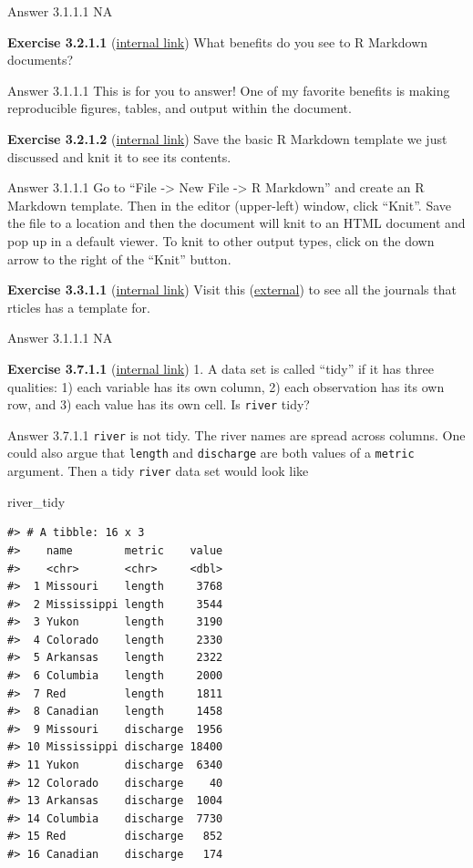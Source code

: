 \documentclass[
]{book}
\newenvironment{Shaded}{\begin{snugshade}}{\end{snugshade}}
\newcommand{\NormalTok}[1]{#1}
\begin{document}
Answer 3.1.1.1
NA

\textbf{Exercise 3.2.1.1} (\protect\hyperlink{ex-set12}{internal link})
What benefits do you see to R Markdown documents?

Answer 3.1.1.1
This is for you to answer! One of my favorite benefits is making reproducible figures, tables, and output within the document.

\textbf{Exercise 3.2.1.2} (\protect\hyperlink{ex-set12}{internal link})
Save the basic R Markdown template we just discussed and knit it to see its contents.

Answer 3.1.1.1
Go to ``File -\textgreater{} New File -\textgreater{} R Markdown'' and create an R Markdown template. Then in the editor (upper-left) window, click ``Knit''. Save the file to a location and then the document will knit to an HTML document and pop up in a default viewer. To knit to other output types, click on the down arrow to the right of the ``Knit'' button.

\textbf{Exercise 3.3.1.1} (\protect\hyperlink{ex-set13}{internal link})
Visit this (\href{https://github.com/rstudio/rticles}{external}) to see all the journals that rticles has a template for.

Answer 3.1.1.1
NA

\textbf{Exercise 3.7.1.1} (\protect\hyperlink{ex-set14}{internal link})
1. A data set is called ``tidy'' if it has three qualities: 1) each variable has its own column, 2) each observation has its own row, and 3) each value has its own cell. Is \texttt{river} tidy?

Answer 3.7.1.1
\texttt{river} is not tidy. The river names are spread across columns. One could also argue that \texttt{length} and \texttt{discharge} are both values of a \texttt{metric} argument. Then a tidy \texttt{river} data set would look like

\begin{Shaded}
\begin{Highlighting}[]
\NormalTok{river_tidy}
\end{Highlighting}
\end{Shaded}

\begin{verbatim}
#> # A tibble: 16 x 3
#>    name        metric    value
#>    <chr>       <chr>     <dbl>
#>  1 Missouri    length     3768
#>  2 Mississippi length     3544
#>  3 Yukon       length     3190
#>  4 Colorado    length     2330
#>  5 Arkansas    length     2322
#>  6 Columbia    length     2000
#>  7 Red         length     1811
#>  8 Canadian    length     1458
#>  9 Missouri    discharge  1956
#> 10 Mississippi discharge 18400
#> 11 Yukon       discharge  6340
#> 12 Colorado    discharge    40
#> 13 Arkansas    discharge  1004
#> 14 Columbia    discharge  7730
#> 15 Red         discharge   852
#> 16 Canadian    discharge   174
\end{verbatim}
\end{document}
